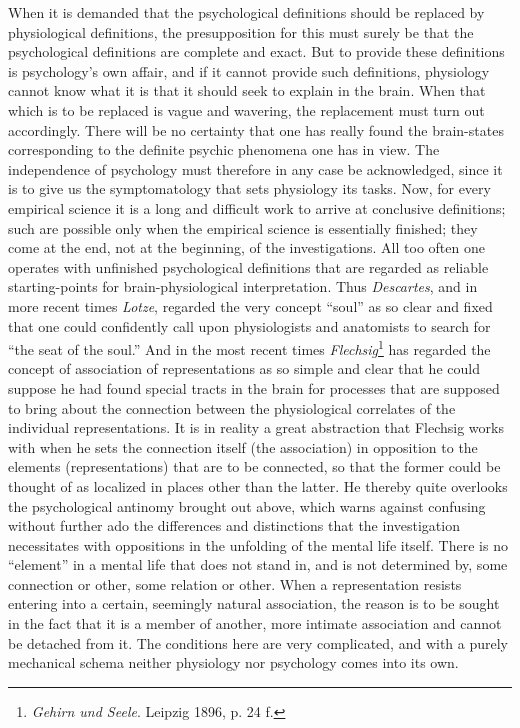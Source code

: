 \documentclass[12pt,a4paper]{book}
\newcommand{\opage}[1]{\marginnote{\footnotesize\textit{[#1]}}}
\begin{document}
When it is demanded that the psychological definitions should be
replaced by physiological definitions, the presupposition for this must
surely be that the psychological definitions are complete and exact. But
to provide these definitions is psychology's own affair, and if it
cannot provide such definitions, physiology cannot know what it is that
it should seek to explain in the brain. When that which is to be
replaced is vague and wavering, the replacement must turn out
accordingly. There will be no certainty that one has really found the
brain-states corresponding to the definite psychic phenomena one has in
view. The independence of psychology must therefore in any case be
acknowledged, since it is to give us the symptomatology that sets
physiology its tasks. Now, for every empirical science it is a long and
difficult work to arrive at conclusive definitions; such are possible
only when the empirical science is essentially finished; they come at
the end, not at the beginning, of the investigations. All too often one
operates with unfinished psychological definitions that are regarded as
reliable starting-points for brain-physiological interpretation. Thus
\emph{Descartes}, and in more recent times \emph{Lotze}, regarded the
very concept ``soul'' as so clear and fixed that one could confidently
call upon physiologists and anatomists to search for ``the seat of the
soul.'' And in the most recent times \emph{Flechsig}\footnote{\emph{Gehirn
und Seele}. Leipzig 1896, p. 24 f.} has regarded the concept of
association of representations as so simple and clear that he could
suppose he had found special tracts in the brain for processes that are
supposed to bring about the connection between the physiological
correlates of the individual representations. It is in reality a great
abstraction that Flechsig works with when he sets the connection itself
(the association) in opposition to the elements (representations) that
are to be \opage{26}connected, so that the former could be thought of as localized
in places other than the latter. He thereby quite overlooks the
psychological antinomy brought out above, which warns against confusing
without further ado the differences and distinctions that the
investigation necessitates with oppositions in the unfolding of the
mental life itself. There is no ``element'' in a mental life that does
not stand in, and is not determined by, some connection or other, some
relation or other. When a representation resists entering into a
certain, seemingly natural association, the reason is to be sought in
the fact that it is a member of another, more intimate association and
cannot be detached from it. The conditions here are very complicated,
and with a purely mechanical schema neither physiology nor psychology
comes into its own.
\end{document}
